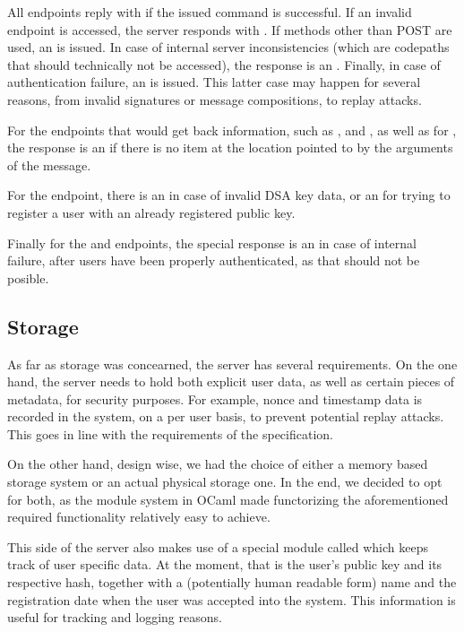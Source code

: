 All endpoints reply with  if the issued command is successful.
If an invalid endpoint is accessed, the server responds with .
If methods other than POST are used, an  is issued.
In case of internal server inconsistencies (which are codepaths that should technically not be accessed), the response is an .
Finally, in case of authentication failure, an  is issued.
This latter case may happen for several reasons, from invalid signatures or message compositions, to replay attacks.

For the endpoints that would get back information, such as ,  and , as well as for , the response is an  if there is no item at the location pointed to by the arguments of the message.

For the  endpoint, there is an  in case of invalid DSA key data, or an  for trying to register a user with an already registered public key.

Finally for the  and  endpoints, the special response is an  in case of internal failure, after users have been properly authenticated, as that should not be posible.

\subsection{Storage}
As far as storage was concearned, the server has several requirements.
On the one hand, the server needs to hold both explicit user data, as well as certain pieces of metadata, for security purposes.
For example, nonce and timestamp data is recorded in the system, on a per user basis, to prevent potential replay attacks.
This goes in line with the requirements of the specification.

On the other hand, design wise, we had the choice of either a memory based storage system or an actual physical storage one.
In the end, we decided to opt for both, as the module system in OCaml made functorizing the aforementioned required functionality relatively easy to achieve.

This side of the server also makes use of a special module called  which keeps track of user specific data.
At the moment, that is the user's public key and its respective hash, together with a (potentially human readable form) name and the registration date when the user was accepted into the system.
This information is useful for tracking and logging reasons.

